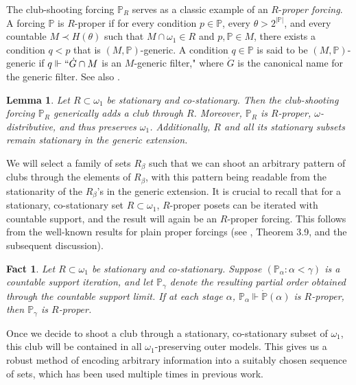 \documentclass[a4paper,11pt]{article}
\newtheorem{lemma}[theorem]{Lemma}
\newtheorem{fact}[theorem]{Fact}
\newcommand{\forceP}{\mathbb{P}}
\begin{document}
The club-shooting forcing \( \forceP_R \) serves as a classic example of an \( R \)-\emph{proper forcing}. A forcing \( \forceP \) is \( R \)-proper if for every condition \( p \in \forceP \), every \( \theta > 2^{|\forceP|} \), and every countable \( M \prec H(\theta) \) such that \( M \cap \omega_1 \in R \) and \( p, \forceP \in M \), there exists a condition \( q < p \) that is \( (M, \forceP) \)-generic. A condition \( q \in \forceP \) is said to be \( (M, \forceP) \)-generic if \( q \Vdash ``\dot{G} \cap M \) is an \( M \)-generic filter," where \( \dot{G} \) is the canonical name for the generic filter. See also \cite{Goldstern}.

\begin{lemma}
Let \( R \subset \omega_1 \) be stationary and co-stationary. Then the club-shooting forcing \( \forceP_R \) generically adds a club through \( R \). Moreover, \( \forceP_R \) is \( R \)-proper, \( \omega \)-distributive, and thus preserves \( \omega_1 \). Additionally, \( R \) and all its stationary subsets remain stationary in the generic extension.
\end{lemma}

We will select a family of sets \( R_{\beta} \) such that we can shoot an arbitrary pattern of clubs through the elements of \( R_{\beta} \), with this pattern being readable from the stationarity of the \( R_{\beta} \)'s in the generic extension. It is crucial to recall that for a stationary, co-stationary set \( R \subset \omega_1 \), \( R \)-proper posets can be iterated with countable support, and the result will again be an \( R \)-proper forcing. This follows from the well-known results for plain proper forcings (see \cite{Goldstern}, Theorem 3.9, and the subsequent discussion).

\begin{fact}
Let \( R \subset \omega_1 \) be stationary and co-stationary. Suppose \( (\forceP_{\alpha} : \alpha < \gamma) \) is a countable support iteration, and let \( \forceP_{\gamma} \) denote the resulting partial order obtained through the countable support limit. If at each stage \( \alpha \), \( \forceP_{\alpha} \Vdash \dot{\forceP}(\alpha) \) is \( R \)-proper, then \( \forceP_{\gamma} \) is \( R \)-proper.
\end{fact}

Once we decide to shoot a club through a stationary, co-stationary subset of \( \omega_1 \), this club will be contained in all \( \omega_1 \)-preserving outer models. This gives us a robust method of encoding arbitrary information into a suitably chosen sequence of sets, which has been used multiple times in previous work.
\end{document}

